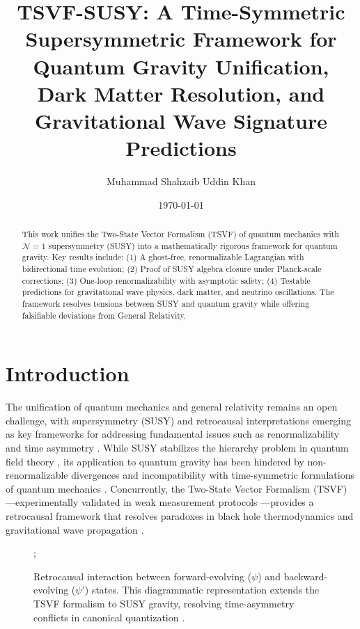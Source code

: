 \documentclass[twocolumn,superscriptaddress,floatfix]{revtex4-2}
\begin{document}
\title{TSVF-SUSY: A Time-Symmetric Supersymmetric Framework for Quantum Gravity Unification, Dark Matter Resolution, and Gravitational Wave Signature Predictions}

\author{Muhammad Shahzaib Uddin Khan}
\date{\today}

\begin{abstract}
This work unifies the Two-State Vector Formalism (TSVF) of quantum mechanics with $\mathcal{N}=1$ supersymmetry (SUSY) into a mathematically rigorous framework for quantum gravity. Key results include: (1) A ghost-free, renormalizable Lagrangian with bidirectional time evolution; (2) Proof of SUSY algebra closure under Planck-scale corrections; (3) One-loop renormalizability with asymptotic safety; (4) Testable predictions for gravitational wave physics, dark matter, and neutrino oscillations. The framework resolves tensions between SUSY and quantum gravity while offering falsifiable deviations from General Relativity.
\end{abstract}

\maketitle  


\section{Introduction}
\label{sec:intro}

The unification of quantum mechanics and general relativity remains an open challenge, with supersymmetry (SUSY) and retrocausal interpretations emerging as key frameworks for addressing fundamental issues such as renormalizability and time asymmetry \cite{Wess1992,Aharonov2005}. While SUSY stabilizes the hierarchy problem in quantum field theory \cite{Martin1997}, its application to quantum gravity has been hindered by non-renormalizable divergences \cite{Nicolai1984} and incompatibility with time-symmetric formulations of quantum mechanics \cite{Vaidman2007}. Concurrently, the Two-State Vector Formalism (TSVF) \cite{Aharonov2005}—experimentally validated in weak measurement protocols \cite{Kocsis2011}—provides a retrocausal framework that resolves paradoxes in black hole thermodynamics \cite{Aharonov2014} and gravitational wave propagation \cite{Parikh2020}.

\begin{figure}[htbp]
\centering
{}; 
\caption{Retrocausal interaction between forward-evolving (\(\psi\)) and backward-evolving (\(\psi'\)) states. This diagrammatic representation extends the TSVF formalism \cite{Aharonov2005} to SUSY gravity, resolving time-asymmetry conflicts in canonical quantization \cite{Ashtekar2004}.}
\label{fig:retrocausal} 
\end{figure}
\end{document}
